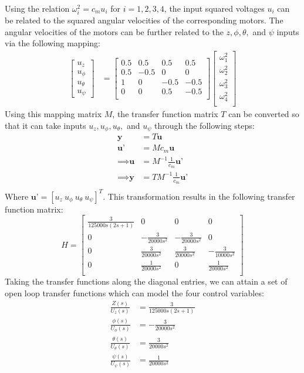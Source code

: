 \documentclass[12pt]{article}
\begin{document}
Using the relation $\omega_i^2 = c_mu_i$ for $i = 1,2,3,4$, the input squared voltages $u_i$ can be related 
to the squared angular velocities of the corresponding motors. The angular velocities of the motors can be further
related to the $z,\phi, \theta,$ and $\psi$ inputs via the following mapping:
\begin{align*}
  \begin{bmatrix}
    u_z \\
    u_{\phi} \\
    u_{\theta} \\
    u_{\psi} 
  \end{bmatrix}
  &= 
  \begin{bmatrix}
    0.5 & 0.5 & 0.5 & 0.5 \\
    0.5 & -0.5 & 0 & 0 \\
    1 & 0 & -0.5 & -0.5 \\
    0 & 0 & 0.5 & -0.5 \\
  \end{bmatrix}
  \begin{bmatrix}
    \omega_1^2 \\
    \omega_2^2 \\
    \omega_3^2 \\
    \omega_4^2 \\
  \end{bmatrix}
\end{align*}
Using this mapping matrix $M$, the transfer function matrix $T$ can be converted
so that it can take inputs $u_z, u_{\phi}, u_{\theta},$ and $u_{\psi}$
through the following steps:
\begin{align*}
   \textbf{y} &= T\textbf{u} \\
   \textbf{u'} &= Mc_m\textbf{u} \\
   \implies \textbf{u} &= M^{-1}\frac{1}{c_m}\textbf{u'} \\
   \implies \textbf{y} &= TM^{-1}\frac{1}{c_m}\textbf{u'} \\
\end{align*}
Where $\textbf{u'} = [u_z \ u_{\phi} \ u_{\theta} \ u_{\psi}]^T$. This transformation results in 
the following transfer function matrix:
\[
  H =
\begin{bmatrix}
  \frac{3}{125000s(2s + 1)} & 0 & 0 & 0 \\[6pt]
    0 & -\frac{3}{20000s^2} & -\frac{3}{20000s^2} & 0 \\[6pt]
    0 & \frac{3}{20000s^2} & \frac{3}{20000s^2} & -\frac{3}{10000s^2} \\[6pt]
    0 &  \frac{1}{20000s^2}& 0 & \frac{1}{20000s^2} \\[6pt]
\end{bmatrix}
\]
Taking the transfer functions along the diagonal entries, we can attain a set of open loop transfer functions
which can model the four control variables:
\begin{align*}
  \frac{Z(s)}{U_z(s)} &= \frac{3}{125000s(2s + 1)}\\
  \frac{\phi(s)}{U_{\phi}(s)} &= -\frac{3}{20000s^2}\\
  \frac{\theta(s)}{U_{\theta}(s)} &= \frac{3}{20000s^2}\\
  \frac{\psi(s)}{U_{\psi}(s)} &= \frac{1}{20000s^2}
\end{align*} 
\end{document}
